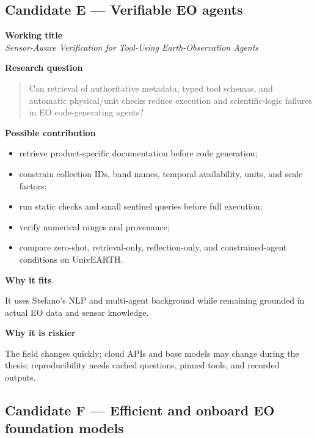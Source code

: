 \documentclass[
  a4paper,
  11pt]{article}
\providecommand{\tightlist}{%
  \setlength{\itemsep}{0pt}\setlength{\parskip}{0pt}}
\begin{document}
\hypertarget{candidate-e-verifiable-eo-agents}{%
\subsection{Candidate E --- Verifiable EO
agents}\label{candidate-e-verifiable-eo-agents}}

\textbf{Working title}\\
\emph{Sensor-Aware Verification for Tool-Using Earth-Observation Agents}

\textbf{Research question}

\begin{quote}
Can retrieval of authoritative metadata, typed tool schemas, and
automatic physical/unit checks reduce execution and scientific-logic
failures in EO code-generating agents?
\end{quote}

\textbf{Possible contribution}

\begin{itemize}
\tightlist
\item
  retrieve product-specific documentation before code generation;
\item
  constrain collection IDs, band names, temporal availability, units,
  and scale factors;
\item
  run static checks and small sentinel queries before full execution;
\item
  verify numerical ranges and provenance;
\item
  compare zero-shot, retrieval-only, reflection-only, and
  constrained-agent conditions on UnivEARTH.
\end{itemize}

\textbf{Why it fits}

It uses Stefano's NLP and multi-agent background while remaining
grounded in actual EO data and sensor knowledge.

\textbf{Why it is riskier}

The field changes quickly; cloud APIs and base models may change during
the thesis; reproducibility needs cached questions, pinned tools, and
recorded outputs.

\hypertarget{candidate-f-efficient-and-onboard-eo-foundation-models}{%
\subsection{Candidate F --- Efficient and onboard EO foundation
models}\label{candidate-f-efficient-and-onboard-eo-foundation-models}}
\end{document}
